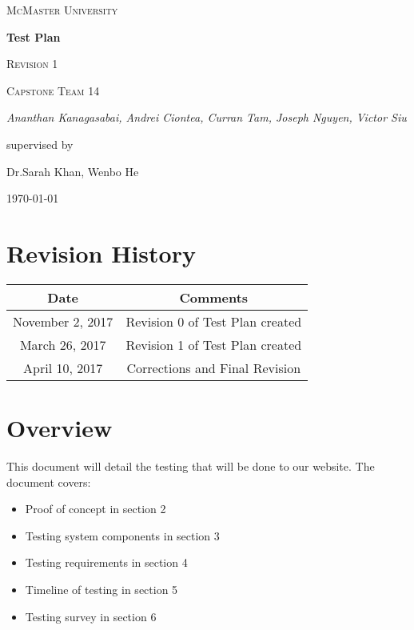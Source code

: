 \documentclass[12pt]{article}
\begin{document}
\begin{titlepage}
	\centering
	{\scshape\LARGE McMaster University \par}
	\vspace{1.5cm}
	{\huge\bfseries Test Plan \par}
    {\scshape\Large Revision 1 \par}

	\vspace{1cm}
	{\scshape\Large Capstone Team 14\par}
	{\Large\itshape Ananthan Kanagasabai, Andrei Ciontea, Curran Tam, Joseph Nguyen, Victor Siu \par}
	\vspace{3cm}
	\vfill
	supervised by\par
	Dr.Sarah Khan, Wenbo He

	\vfill
	{\large \today\par}
\end{titlepage}

\newpage

\tableofcontents

\section*{Revision History}
\begin{tabular}{|c|c|}
\hline
\textbf{Date}  & \textbf{Comments} \\ \hline
November 2, 2017 & Revision 0 of Test Plan created \\ \hline
March 26, 2017 & Revision 1 of Test Plan created \\ \hline
April 10, 2017 & Corrections and Final Revision \\ \hline
\end{tabular}

\newpage

\section{Overview}
This document will detail the testing that will be done to our website. The document covers:
\begin{itemize}
\item Proof of concept in section 2
\item Testing system components in section 3
\item Testing requirements in section 4
\item Timeline of testing in section 5
\item Testing survey in section 6
\end{itemize}
\end{document}

